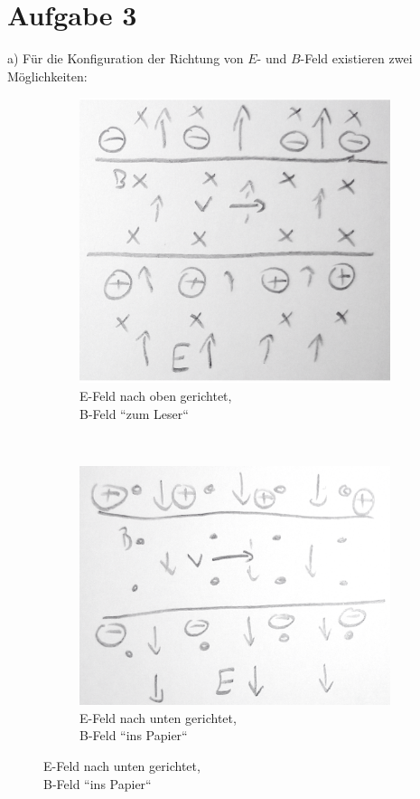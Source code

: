 \documentclass[11pt a4paper]{article}
\begin{document}
\newpage
\section*{Aufgabe 3}
a) Für die Konfiguration der Richtung von $E$- und $B$-Feld existieren zwei
Möglichkeiten:
\begin{figure}[H]
	\centering
	\begin{subfigure}[b]{0.3\textwidth}
		\includegraphics[width=\textwidth]
		{aufgabe3a_efeld_oben.png}
		\caption{E-Feld nach oben gerichtet,\\B-Feld ``zum Leser``}
	\end{subfigure}
	~
	\begin{subfigure}[b]{0.3\textwidth}
		\includegraphics[width=\textwidth]
		{aufgabe3a_efeld_unten.png}
		\caption{E-Feld nach unten gerichtet,\\B-Feld ``ins Papier``}
	\end{subfigure}
\end{figure}
\end{document}

